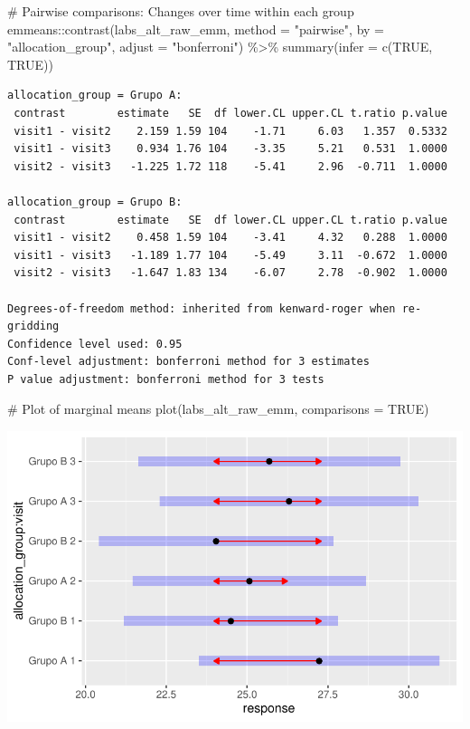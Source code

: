 \documentclass[
  12pt,
]{article}
\newenvironment{Shaded}{\begin{snugshade}}{\end{snugshade}}
\newcommand{\AttributeTok}[1]{\textcolor[rgb]{0.40,0.45,0.13}{#1}}
\newcommand{\CommentTok}[1]{\textcolor[rgb]{0.37,0.37,0.37}{#1}}
\newcommand{\ConstantTok}[1]{\textcolor[rgb]{0.56,0.35,0.01}{#1}}
\newcommand{\FunctionTok}[1]{\textcolor[rgb]{0.28,0.35,0.67}{#1}}
\newcommand{\NormalTok}[1]{\textcolor[rgb]{0.00,0.23,0.31}{#1}}
\newcommand{\SpecialCharTok}[1]{\textcolor[rgb]{0.37,0.37,0.37}{#1}}
\newcommand{\StringTok}[1]{\textcolor[rgb]{0.13,0.47,0.30}{#1}}
\begin{document}
\begin{Shaded}
\begin{Highlighting}[]
\CommentTok{\# Pairwise comparisons: Changes over time within each group}
\NormalTok{emmeans}\SpecialCharTok{::}\FunctionTok{contrast}\NormalTok{(labs\_alt\_raw\_emm,}
\AttributeTok{method =} \StringTok{"pairwise"}\NormalTok{, }\AttributeTok{by =} \StringTok{"allocation\_group"}\NormalTok{,}
\AttributeTok{adjust =} \StringTok{"bonferroni"}\NormalTok{) }\SpecialCharTok{\%\textgreater{}\%} \FunctionTok{summary}\NormalTok{(}\AttributeTok{infer =} \FunctionTok{c}\NormalTok{(}\ConstantTok{TRUE}\NormalTok{, }\ConstantTok{TRUE}\NormalTok{))}
\end{Highlighting}
\end{Shaded}

\begin{verbatim}
allocation_group = Grupo A:
 contrast        estimate   SE  df lower.CL upper.CL t.ratio p.value
 visit1 - visit2    2.159 1.59 104    -1.71     6.03   1.357  0.5332
 visit1 - visit3    0.934 1.76 104    -3.35     5.21   0.531  1.0000
 visit2 - visit3   -1.225 1.72 118    -5.41     2.96  -0.711  1.0000

allocation_group = Grupo B:
 contrast        estimate   SE  df lower.CL upper.CL t.ratio p.value
 visit1 - visit2    0.458 1.59 104    -3.41     4.32   0.288  1.0000
 visit1 - visit3   -1.189 1.77 104    -5.49     3.11  -0.672  1.0000
 visit2 - visit3   -1.647 1.83 134    -6.07     2.78  -0.902  1.0000

Degrees-of-freedom method: inherited from kenward-roger when re-gridding 
Confidence level used: 0.95 
Conf-level adjustment: bonferroni method for 3 estimates 
P value adjustment: bonferroni method for 3 tests 
\end{verbatim}

\begin{Shaded}
\begin{Highlighting}[]
\CommentTok{\# Plot of marginal means}
\FunctionTok{plot}\NormalTok{(labs\_alt\_raw\_emm, }\AttributeTok{comparisons =} \ConstantTok{TRUE}\NormalTok{)}
\end{Highlighting}
\end{Shaded}

\includegraphics{Outcomes_files/figure-pdf/labs_alt_raw_emm-1.pdf}
\end{document}
